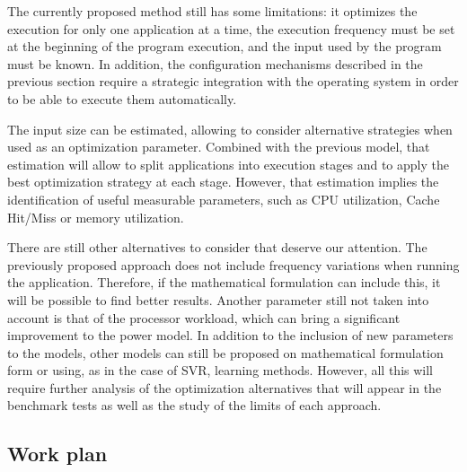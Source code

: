 The currently proposed method still has some limitations: it optimizes the execution for only one application at a time, the execution frequency must be set at the beginning of the program execution, and the input used by the program must be known. In addition, the configuration mechanisms described in the previous section require a strategic integration with the operating system in order to be able to execute them automatically.

The input size can be estimated, allowing to consider alternative strategies when used as an optimization parameter. Combined with the previous model, that estimation will allow to split applications into execution stages and to apply the best optimization strategy at each stage. However, that estimation implies the identification of useful measurable parameters, such as CPU utilization, Cache Hit/Miss or memory utilization. 

There are still other alternatives to consider that deserve our attention. The previously proposed approach does not include frequency variations when running the application. Therefore, if the mathematical formulation can include this, it will be possible to find better results. Another parameter still not taken into account is that of the processor workload, which can bring a significant improvement to the power model. In addition to the inclusion of new parameters to the models, other models can still be proposed on mathematical formulation form or using, as in the case of SVR, learning methods. However, all this will require further analysis of the optimization alternatives that will appear in the benchmark tests as well as the study of the limits of each approach.

\subsection{Work plan}

